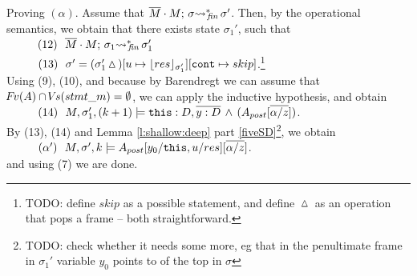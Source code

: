 \begin{description}
 \vspace{.1cm}
Proving $(\alpha)$. Assume that   $\leadstoBoundedStarFin  {\Mtwo\cdot M}  {\sigma}  {\sigma'}$. Then, by the operational semantics, we obtain that 
there exists state $\sigma_1'$, such that \\
$\SPS (12) \ \ \leadstoBoundedStarFin  {\Mtwo\cdot M}  {\sigma_1}  {\sigma_1'}$ \\
$\SPS (13) \ \ \sigma'=(\sigma_1'\popSymbol)[u \mapsto {\interpret {\sigma_1'} {res}}][\prg{cont}\mapsto skip]$.\footnote{TODO: define $skip$ as a possible statement, and define $\popSymbol$ as an operation that pops a frame -- both straightforward.}
\\
Using (9), (10), and because by Barendregt we can assume that $\fv(A)\cap \vs(stmt\_m) = \emptyset$, we can apply the inductive hypothesis, and obtain\\
$\SPS (14) \ \  \satDAssertFrom M  {\sigma_1'} {(k+1)}   {\prg{this}:D,\overline{y:D}\, \wedge\, (A_{post}[\overline{\alpha/z}])}$.
\\
By (13), (14) and Lemma  \ref{l:shallow:deep} part \ref{fiveSD}\footnote{TODO: check whether it needs some more, eg that in the penultimate frame in $\sigma_1'$ variable $y_0$ points to  of the top in $\sigma$}, we obtain\\
$\SPS (\alpha') \ \  \satDAssertFrom M  {\sigma'} {k}   {A_{post}[y_0/ \prg{this},u/res][\overline{\alpha/z}]}$.\\
and using (7) we are done.


\end{description}
